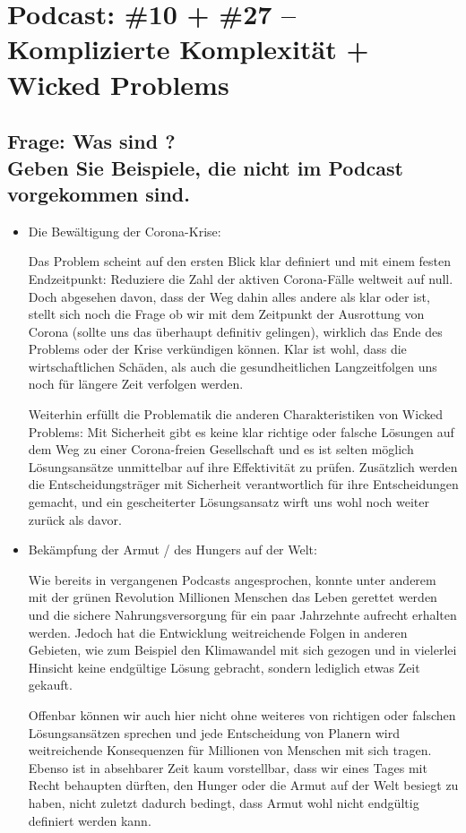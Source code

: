 \documentclass[twoside, a4paper, DIV=11, open=any, bibliography=totoc]{scrbook}
\begin{document}
\section{Podcast: \#10 + \#27 -- Komplizierte Komplexität + Wicked Problems}

\subsection{Frage: Was sind ? \\
Geben Sie Beispiele, die nicht im Podcast vorgekommen sind. }

\begin{itemize}
  \item Die Bewältigung der Corona-Krise:


  Das Problem scheint auf den ersten Blick klar definiert und mit einem
  festen Endzeitpunkt: Reduziere die Zahl der aktiven Corona-Fälle weltweit
  auf null. Doch abgesehen davon, dass der Weg dahin alles andere als klar
  oder  ist, stellt sich noch die Frage ob wir mit dem
  Zeitpunkt der Ausrottung von Corona (sollte uns das überhaupt definitiv gelingen),
  wirklich das Ende des Problems oder der Krise verkündigen können.
  Klar ist wohl, dass die wirtschaftlichen Schäden, als auch die gesundheitlichen
  Langzeitfolgen uns noch für längere Zeit verfolgen werden.


  Weiterhin erfüllt die Problematik die anderen Charakteristiken von Wicked Problems:
  Mit Sicherheit gibt es keine klar richtige oder falsche Lösungen auf dem Weg
  zu einer Corona-freien Gesellschaft und es ist selten möglich Lösungsansätze
  unmittelbar auf ihre Effektivität zu prüfen. Zusätzlich werden die Entscheidungsträger
  mit Sicherheit verantwortlich für ihre Entscheidungen gemacht, und ein
  gescheiterter Lösungsansatz wirft uns wohl noch weiter zurück als davor.
  \item Bekämpfung der Armut / des Hungers auf der Welt:


  Wie bereits in vergangenen Podcasts angesprochen, konnte
  unter anderem mit der grünen Revolution Millionen Menschen das Leben gerettet werden
  und die sichere Nahrungsversorgung für ein paar Jahrzehnte aufrecht erhalten werden.
  Jedoch hat die Entwicklung weitreichende Folgen in anderen Gebieten, wie zum
  Beispiel den Klimawandel mit sich gezogen und in vielerlei Hinsicht keine
  endgültige Lösung gebracht, sondern lediglich etwas Zeit gekauft.


  Offenbar können wir auch hier nicht ohne weiteres von richtigen oder falschen
  Lösungsansätzen sprechen und jede Entscheidung von Planern wird weitreichende
  Konsequenzen für Millionen von Menschen mit sich tragen. Ebenso ist in
  absehbarer Zeit kaum vorstellbar, dass wir eines Tages mit Recht behaupten
  dürften, den Hunger oder die Armut auf der Welt besiegt zu haben, nicht
  zuletzt dadurch bedingt, dass Armut wohl nicht endgültig definiert werden kann.

\end{itemize}
\end{document}
